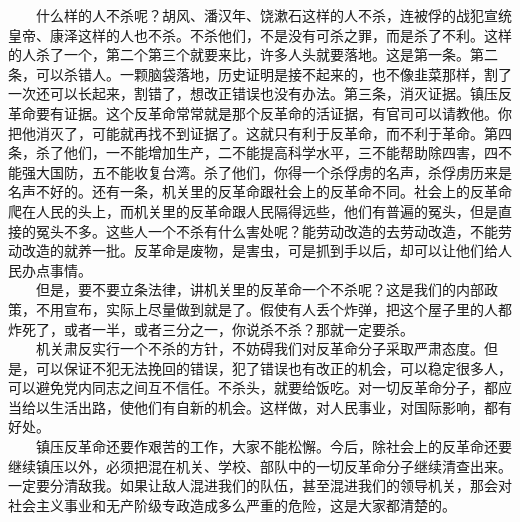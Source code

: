 \documentclass[cn,11pt,chinese]{elegantbook}
\begin{document}
　　什么样的人不杀呢？胡风、潘汉年、饶漱石这样的人不杀，连被俘的战犯宣统皇帝、康泽这样的人也不杀。不杀他们，不是没有可杀之罪，而是杀了不利。这样的人杀了一个，第二个第三个就要来比，许多人头就要落地。这是第一条。第二条，可以杀错人。一颗脑袋落地，历史证明是接不起来的，也不像韭菜那样，割了一次还可以长起来，割错了，想改正错误也没有办法。第三条，消灭证据。镇压反革命要有证据。这个反革命常常就是那个反革命的活证据，有官司可以请教他。你把他消灭了，可能就再找不到证据了。这就只有利于反革命，而不利于革命。第四条，杀了他们，一不能增加生产，二不能提高科学水平，三不能帮助除四害，四不能强大国防，五不能收复台湾。杀了他们，你得一个杀俘虏的名声，杀俘虏历来是名声不好的。还有一条，机关里的反革命跟社会上的反革命不同。社会上的反革命爬在人民的头上，而机关里的反革命跟人民隔得远些，他们有普遍的冤头，但是直接的冤头不多。这些人一个不杀有什么害处呢？能劳动改造的去劳动改造，不能劳动改造的就养一批。反革命是废物，是害虫，可是抓到手以后，却可以让他们给人民办点事情。\\
　　但是，要不要立条法律，讲机关里的反革命一个不杀呢？这是我们的内部政策，不用宣布，实际上尽量做到就是了。假使有人丢个炸弹，把这个屋子里的人都炸死了，或者一半，或者三分之一，你说杀不杀？那就一定要杀。\\
　　机关肃反实行一个不杀的方针，不妨碍我们对反革命分子采取严肃态度。但是，可以保证不犯无法挽回的错误，犯了错误也有改正的机会，可以稳定很多人，可以避免党内同志之间互不信任。不杀头，就要给饭吃。对一切反革命分子，都应当给以生活出路，使他们有自新的机会。这样做，对人民事业，对国际影响，都有好处。\\
　　镇压反革命还要作艰苦的工作，大家不能松懈。今后，除社会上的反革命还要继续镇压以外，必须把混在机关、学校、部队中的一切反革命分子继续清查出来。一定要分清敌我。如果让敌人混进我们的队伍，甚至混进我们的领导机关，那会对社会主义事业和无产阶级专政造成多么严重的危险，这是大家都清楚的。\\
\end{document}
